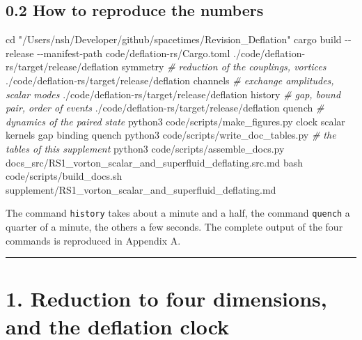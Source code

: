 \documentclass[
  10pt,
]{article}
\newenvironment{Shaded}{}{}
\newcommand{\AttributeTok}[1]{\textcolor[rgb]{0.49,0.56,0.16}{#1}}
\newcommand{\BuiltInTok}[1]{\textcolor[rgb]{0.00,0.50,0.00}{#1}}
\newcommand{\CommentTok}[1]{\textcolor[rgb]{0.38,0.63,0.69}{\textit{#1}}}
\newcommand{\ExtensionTok}[1]{#1}
\newcommand{\FunctionTok}[1]{\textcolor[rgb]{0.02,0.16,0.49}{#1}}
\newcommand{\NormalTok}[1]{#1}
\newcommand{\StringTok}[1]{\textcolor[rgb]{0.25,0.44,0.63}{#1}}
\begin{document}
\hypertarget{how-to-reproduce-the-numbers}{%
\subsection{0.2 How to reproduce the
numbers}\label{how-to-reproduce-the-numbers}}

\begin{Shaded}
\begin{Highlighting}[]
\BuiltInTok{cd} \StringTok{"/Users/nsh/Developer/github/spacetimes/Revision\_Deflation"}
\ExtensionTok{cargo}\NormalTok{ build }\AttributeTok{{-}{-}release} \AttributeTok{{-}{-}manifest{-}path}\NormalTok{ code/deflation{-}rs/Cargo.toml}
\ExtensionTok{./code/deflation{-}rs/target/release/deflation}\NormalTok{ symmetry   }\CommentTok{\# reduction of the couplings, vortices}
\ExtensionTok{./code/deflation{-}rs/target/release/deflation}\NormalTok{ channels   }\CommentTok{\# exchange amplitudes, scalar modes}
\ExtensionTok{./code/deflation{-}rs/target/release/deflation}\NormalTok{ history    }\CommentTok{\# gap, bound pair, order of events}
\ExtensionTok{./code/deflation{-}rs/target/release/deflation}\NormalTok{ quench     }\CommentTok{\# dynamics of the paired state}
\ExtensionTok{python3}\NormalTok{ code/scripts/make\_figures.py clock scalar kernels gap binding quench}
\ExtensionTok{python3}\NormalTok{ code/scripts/write\_doc\_tables.py                 }\CommentTok{\# the tables of this supplement}
\ExtensionTok{python3}\NormalTok{ code/scripts/assemble\_docs.py docs\_src/RS1\_vorton\_scalar\_and\_superfluid\_deflating.src.md}
\FunctionTok{bash}\NormalTok{ code/scripts/build\_docs.sh supplement/RS1\_vorton\_scalar\_and\_superfluid\_deflating.md}
\end{Highlighting}
\end{Shaded}

The command \texttt{history} takes about a minute and a half, the
command \texttt{quench} a quarter of a minute, the others a few seconds.
The complete output of the four commands is reproduced in Appendix A.

\begin{center}\rule{0.5\linewidth}{0.5pt}\end{center}

\hypertarget{reduction-to-four-dimensions-and-the-deflation-clock}{%
\section{1. Reduction to four dimensions, and the deflation
clock}\label{reduction-to-four-dimensions-and-the-deflation-clock}}
\end{document}
